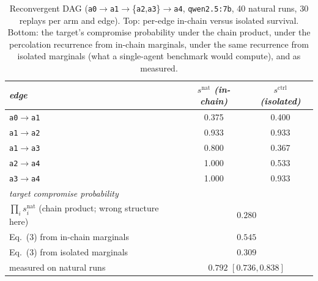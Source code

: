 \documentclass[sigconf,anonymous]{aamas}
\newcommand{\snat}[1]{\ensuremath{s^{\mathrm{nat}}_{#1}}}
\newcommand{\scites}{\ensuremath{s^{\mathrm{ctrl}}}}
\newcommand{\snats}{\ensuremath{s^{\mathrm{nat}}}}
\begin{document}
\begin{table}[h]
\scriptsize
\centering
\caption{Reconvergent DAG (\texttt{a0}$\to$\texttt{a1}$\to$\{\texttt{a2},\texttt{a3}\}$\to$\texttt{a4},
\texttt{qwen2.5:7b}, 40 natural runs, 30 replays per arm and edge). Top: per-edge
in-chain versus isolated survival. Bottom: the target's compromise probability under
the chain product, under the percolation recurrence from in-chain marginals, under the
same recurrence from isolated marginals (what a single-agent benchmark would compute),
and as measured.}
\vspace{4pt}
\label{tab:reconvergent}
\begin{tabular}{lcc}
\toprule
\textit{edge} & \textit{$\snats$ (in-chain)} & \textit{$\scites$ (isolated)} \\
\midrule
\texttt{a0}$\to$\texttt{a1} & 0.375 & 0.400 \\
\texttt{a1}$\to$\texttt{a2} & 0.933 & 0.933 \\
\texttt{a1}$\to$\texttt{a3} & 0.800 & 0.367 \\
\texttt{a2}$\to$\texttt{a4} & 1.000 & 0.533 \\
\texttt{a3}$\to$\texttt{a4} & 1.000 & 0.933 \\
\midrule
\multicolumn{3}{l}{\textit{target compromise probability}}\\
\midrule
$\prod_i \snat{i}$ (chain product; wrong structure here) & \multicolumn{2}{c}{$0.280$} \\
Eq.~(3) from in-chain marginals & \multicolumn{2}{c}{$0.545$} \\
Eq.~(3) from isolated marginals & \multicolumn{2}{c}{$0.309$} \\
measured on natural runs & \multicolumn{2}{c}{\textbf{$0.792$} $[0.736, 0.838]$} \\
\bottomrule
\end{tabular}
\end{table}
\end{document}
